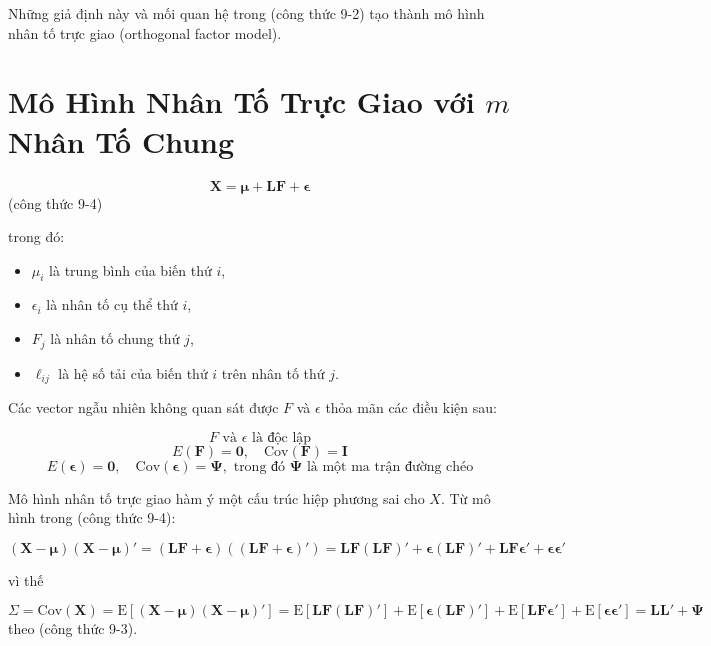 \documentclass{article}
\begin{document}
Những giả định này và mối quan hệ trong (công thức 9-2) tạo thành mô hình nhân tố trực giao (orthogonal factor model).

\section*{Mô Hình Nhân Tố Trực Giao với \(m\) Nhân Tố Chung}

\[
\mathbf{X} = \boldsymbol{\mu} + \mathbf{L} \mathbf{F} + \boldsymbol{\epsilon}
\]
(công thức 9-4)

trong đó:
\begin{itemize}
    \item \(\mu_i\) là trung bình của biến thứ \(i\),
    \item \(\epsilon_i\) là nhân tố cụ thể thứ \(i\),
    \item \(F_j\) là nhân tố chung thứ \(j\),
    \item \(\ell_{ij}\) là hệ số tải của biến thứ \(i\) trên nhân tố thứ \(j\).
\end{itemize}

Các vector ngẫu nhiên không quan sát được \(F\) và \(\epsilon\) thỏa mãn các điều kiện sau:

\[
F \text{ và } \epsilon \text{ là độc lập}
\]
\[
E(\mathbf{F}) = \mathbf{0}, \quad \text{Cov}(\mathbf{F}) = \mathbf{I}
\]
\[
E(\boldsymbol{\epsilon}) = \mathbf{0}, \quad \text{Cov}(\boldsymbol{\epsilon}) = \boldsymbol{\Psi}, \text{ trong đó } \boldsymbol{\Psi} \text{ là một ma trận đường chéo}
\]


\vspace{0.6cm}


Mô hình nhân tố trực giao hàm ý một cấu trúc hiệp phương sai cho \(X\). Từ mô hình trong (công thức 9-4):

\[
(\mathbf{X} - \boldsymbol{\mu})(\mathbf{X} - \boldsymbol{\mu})' = (\mathbf{LF} + \boldsymbol{\epsilon})((\mathbf{LF} + \boldsymbol{\epsilon})')
= \mathbf{LF}(\mathbf{LF})' + \boldsymbol{\epsilon}(\mathbf{LF})' + \mathbf{LF}\boldsymbol{\epsilon}' + \boldsymbol{\epsilon}\boldsymbol{\epsilon}'
\]

vì thế

\[
\Sigma = \text{Cov}(\mathbf{X}) = \text{E}[(\mathbf{X} - \boldsymbol{\mu})(\mathbf{X} - \boldsymbol{\mu})']
= \text{E}[\mathbf{LF}(\mathbf{LF})'] + \text{E}[\boldsymbol{\epsilon}(\mathbf{LF})'] + \text{E}[\mathbf{LF}\boldsymbol{\epsilon}'] + \text{E}[\boldsymbol{\epsilon}\boldsymbol{\epsilon}']
= \mathbf{LL}' + \boldsymbol{\Psi}
\]
theo (công thức 9-3).
\end{document}

